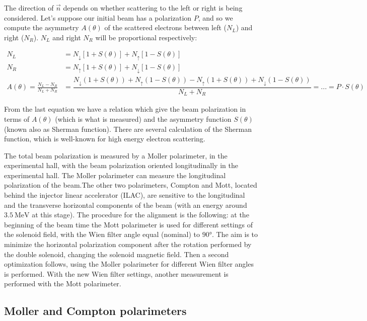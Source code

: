 The direction of $\vec{n}$ depends on whether scattering to the left or right is being considered. Let's suppose our initial beam has a polarization $P$, and so we compute the asymmetry $A(\theta)$ of the scattered electrons between left ($N_{L}$) and right ($N_{R}$). $N_{L}$ and right $N_{R}$ will be proportional respectively:


\begin{align*}
N_{L} &= N_{\downarrow}[1 + S(\theta)] + N_{\uparrow}[1 - S(\theta)] \\
N_{R} &= N_{\uparrow}[1 + S(\theta)] + N_{\downarrow}[1 - S(\theta)]  \\
A(\theta) = \frac{N_{L} - N_{R}}{N_{L} + N_{R}} &= \dfrac{N_{\downarrow}(1 + S(\theta)) + N_{\uparrow}(1 - S(\theta)) - N_{\uparrow}(1 + S(\theta)) + N_{\downarrow}(1 - S(\theta))}{N_{L} + N_{R}} = ... = P \cdot S(\theta)
\end{align*}


From the last equation we have a relation which give the beam polarization in terms of $A(\theta)$ (which is what is measured) and the asymmetry function $S(\theta)$ (known also as Sherman function). There are several calculation of the Sherman function, which is well-known for high energy electron scattering.

The total beam polarization is measured by a Moller polarimeter, in the experimental hall, with the beam polarization oriented longitudinally in the experimental hall. The Moller polarimeter can measure the longitudinal polarization of the beam.The other two polarimeters, Compton and Mott, located behind the injector linear accelerator (ILAC), are sensitive to the longitudinal and the transverse horizontal components of the beam (with an energy around $\SI{3.5}{\mega \electronvolt}$ at this stage). The procedure for the alignment is the following: at the beginning of the beam time the Mott polarimeter is used for different settings of the solenoid field, with the Wien filter angle equal (nominal) to $\ang{90}$. The aim is to minimize the horizontal polarization component after the rotation performed by the double solenoid, changing the solenoid magnetic field. Then a second optimization follows, using the Moller polarimeter for different Wien filter angles is performed. With the new Wien filter settings, another measurement is performed with the Mott polarimeter.

\subsection{Moller and Compton polarimeters}

